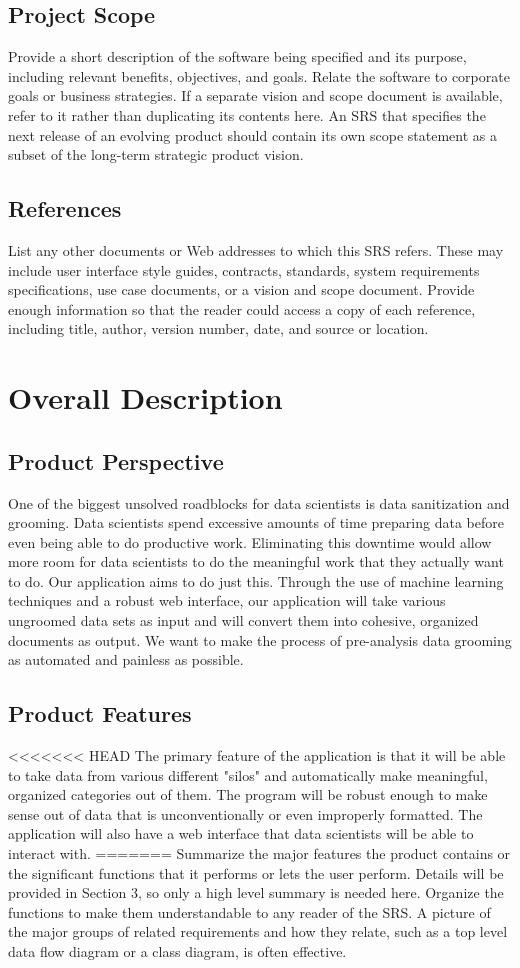 \documentclass[12pt,oneside,letterpaper]{article}
\begin{document}
\subsection{Project Scope}
Provide a short description of the software being specified and its purpose, including relevant benefits, objectives, and goals. Relate the software to corporate goals or business strategies. If a separate vision and scope document is available, refer to it rather than duplicating its contents here. An SRS that specifies the next release of an evolving product should contain its own scope statement as a subset of the long-term strategic product vision.
\subsection{References}
List any other documents or Web addresses to which this SRS refers. These may include user interface style guides, contracts, standards, system requirements specifications, use case documents, or a vision and scope document. Provide enough information so that the reader could access a copy of each reference, including title, author, version number, date, and source or location.

\section{Overall Description}
\subsection{Product Perspective}
One of the biggest unsolved roadblocks for data scientists is data sanitization and grooming. Data scientists spend excessive amounts of time preparing data before even being able to do productive work. Eliminating this downtime would allow more room for data scientists to do the meaningful work that they actually want to do. Our application aims to do just this. Through the use of machine learning techniques and a robust web interface, our application will take various ungroomed data sets as input and will convert them into cohesive, organized documents as output. We want to make the process of pre-analysis data grooming as automated and painless as possible. 
\subsection{Product Features}
<<<<<<< HEAD
The primary feature of the application is that it will be able to take data from various different "silos" and automatically make meaningful, organized categories out of them. The program will be robust enough to make sense out of data that is unconventionally or even improperly formatted. The application will also have a web interface that data scientists will be able to interact with. 
=======
Summarize the major features the product contains or the significant functions that it performs or lets the user perform. Details will be provided in Section 3, so only a high level summary  is needed here. Organize the functions to make them understandable to any reader of the SRS. A picture of the major groups of related requirements and how they relate, such as a top level data flow diagram or a class diagram, is often effective.
\end{document}
